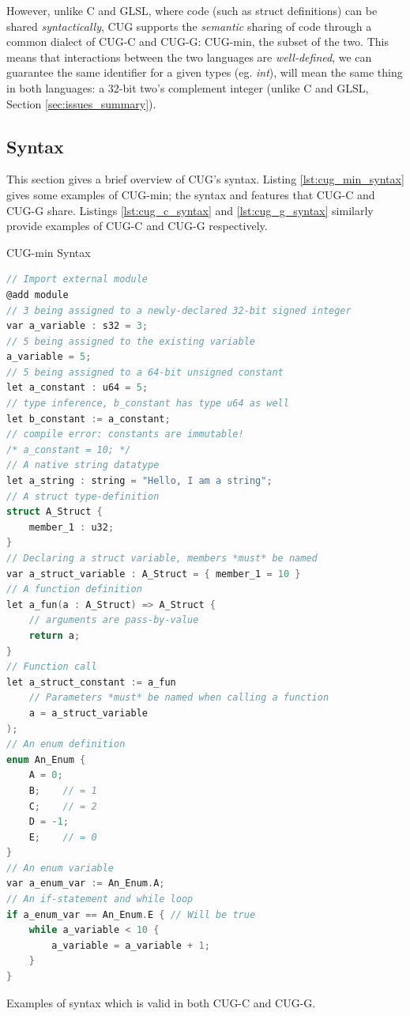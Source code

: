 \documentclass[a4paper,12pt,twoside,openright]{report}
\begin{document}
However, unlike C and GLSL, where code (such as struct definitions) can be
shared \textit{syntactically}, CUG supports the \textit{semantic} sharing of
code through a common dialect of CUG-C and CUG-G: CUG-min, the subset of the
two. This means that interactions between the two languages are
\textit{well-defined}, we can guarantee the same identifier for a given types
(eg. \textit{int}), will mean the same thing in both languages: a 32-bit two's
complement integer (unlike C and GLSL, Section \ref{sec:issues_summary}).

\subsection{Syntax}

\label{sec:language_syntax}

This section gives a brief overview of CUG's syntax. Listing
\ref{lst:cug_min_syntax} gives some examples of CUG-min; the syntax and
features that CUG-C and CUG-G share. Listings \ref{lst:cug_c_syntax} and
\ref{lst:cug_g_syntax} similarly provide examples of CUG-C and CUG-G
respectively.

\begin{lstfloat}
\begin{center} CUG-min Syntax \end{center}
\begin{lstlisting}[language=C]
// Import external module
@add module
// 3 being assigned to a newly-declared 32-bit signed integer
var a_variable : s32 = 3;
// 5 being assigned to the existing variable
a_variable = 5;
// 5 being assigned to a 64-bit unsigned constant
let a_constant : u64 = 5;
// type inference, b_constant has type u64 as well
let b_constant := a_constant;
// compile error: constants are immutable!
/* a_constant = 10; */
// A native string datatype
let a_string : string = "Hello, I am a string";
// A struct type-definition
struct A_Struct {
    member_1 : u32;
}
// Declaring a struct variable, members *must* be named
var a_struct_variable : A_Struct = { member_1 = 10 }
// A function definition
let a_fun(a : A_Struct) => A_Struct {
    // arguments are pass-by-value
    return a;
}
// Function call
let a_struct_constant := a_fun
    // Parameters *must* be named when calling a function
    a = a_struct_variable
);
// An enum definition
enum An_Enum {
    A = 0;
    B;    // = 1
    C;    // = 2
    D = -1;
    E;    // = 0
}
// An enum variable
var a_enum_var := An_Enum.A;
// An if-statement and while loop
if a_enum_var == An_Enum.E { // Will be true
    while a_variable < 10 {
        a_variable = a_variable + 1;
    }
}
\end{lstlisting}
\caption{Examples of syntax which is valid in both CUG-C and CUG-G.}
\label{lst:cug_min_syntax}
\end{lstfloat}
\end{document}
